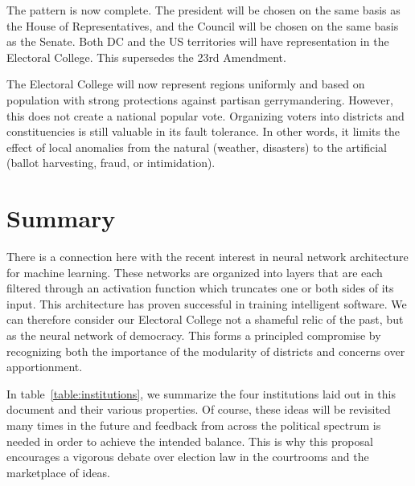 \documentclass{article}
\begin{document}
The pattern is now complete. The president will be chosen on the same basis as the House of Representatives, and the Council will be chosen on the same basis as the Senate. Both DC and the US territories will have representation in the Electoral College. This supersedes the 23rd Amendment.

The Electoral College will now represent regions uniformly and based on population with strong protections against partisan gerrymandering. However, this does not create a national popular vote. Organizing voters into districts and constituencies is still valuable in its fault tolerance. In other words, it limits the effect of local anomalies from the natural (weather, disasters) to the artificial (ballot harvesting, fraud, or intimidation).

\section{Summary}

There is a connection here with the recent interest in neural network architecture for machine learning. These networks are organized into layers that are each filtered through an activation function which truncates one or both sides of its input. This architecture has proven successful in training intelligent software. We can therefore consider our Electoral College not a shameful relic of the past, but as the neural network of democracy. This forms a principled compromise by recognizing both the importance of the modularity of districts and concerns over apportionment.

In table~\ref{table:institutions}, we summarize the four institutions laid out in this document and their various properties. Of course, these ideas will be revisited many times in the future and feedback from across the political spectrum is needed in order to achieve the intended balance. This is why this proposal encourages a vigorous debate over election law in the courtrooms and the marketplace of ideas.
\end{document}
